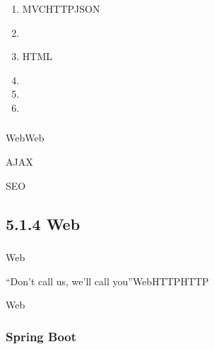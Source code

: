 \important{}

\begin{enumerate}
\def\labelenumi{\arabic{enumi}.}
\item
  \important{}MVCHTTPJSON
\item
  \important{}
\item
  \important{}HTML
\item
  \important{}
\item
  \important{}
\item
  \important{}
\end{enumerate}

\important{}\important{}\important{}\important{}

\hypertarget{section-18}{%
\subsubsection{}\label{section-18}}

Web\important{}Web

AJAX

\important{}\important{}\important{}SEO\important{}

\hypertarget{web}{%
\subsection{5.1.4 Web}\label{web}}

\hypertarget{section-19}{%
\subsubsection{}\label{section-19}}

Web\important{}\important{}\important{}\important{}

\important{}``Don't call us, we'll
call you''WebHTTPHTTP

Web\important{}\important{}\important{}\important{}\important{}

\important{}\important{}\important{}

\hypertarget{spring-boot}{%
\subsubsection{Spring Boot}\label{spring-boot}}

